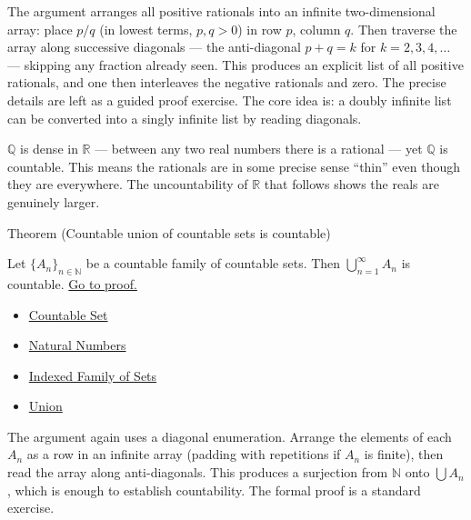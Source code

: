 \begin{remark*}
The argument arranges all positive rationals into an infinite two-dimensional
array: place $p/q$ (in lowest terms, $p,q > 0$) in row $p$, column $q$. Then
traverse the array along successive diagonals --- the anti-diagonal $p + q = k$
for $k = 2, 3, 4, \dots$ --- skipping any fraction already seen. This produces
an explicit list of all positive rationals, and one then interleaves the
negative rationals and zero. The precise details are left as a guided proof
exercise. The core idea is: a doubly infinite list can be converted into a
singly infinite list by reading diagonals.
\end{remark*}

\begin{remark*}
$\mathbb{Q}$ is dense in $\mathbb{R}$ --- between any two real numbers there
is a rational --- yet $\mathbb{Q}$ is countable. This means the rationals are
in some precise sense ``thin'' even though they are everywhere. The uncountability
of $\mathbb{R}$ that follows shows the reals are genuinely larger.
\end{remark*}

\begin{theorembox}{Theorem (Countable union of countable sets is countable)}
\begin{theorem}
\label{thm:countable-union}
Let $\{A_n\}_{n \in \mathbb{N}}$ be a countable family of countable sets.
Then $\bigcup_{n=1}^{\infty} A_n$ is countable.
\hyperref[prf:countable-union]{Go to proof.}
\end{theorem}
\end{theorembox}

\begin{dependencies}
\begin{itemize}
  \item \hyperref[def:countable]{Countable Set}
  \item \hyperref[def:natural-numbers]{Natural Numbers}
  \item \hyperref[def:indexed-family]{Indexed Family of Sets}
  \item \hyperref[def:union]{Union}
\end{itemize}
\end{dependencies}

\begin{remark*}
The argument again uses a diagonal enumeration. Arrange the elements of each
$A_n$ as a row in an infinite array (padding with repetitions if $A_n$ is
finite), then read the array along anti-diagonals. This produces a surjection
from $\mathbb{N}$ onto $\bigcup A_n$, which is enough to establish
countability. The formal proof is a standard exercise.
\end{remark*}

